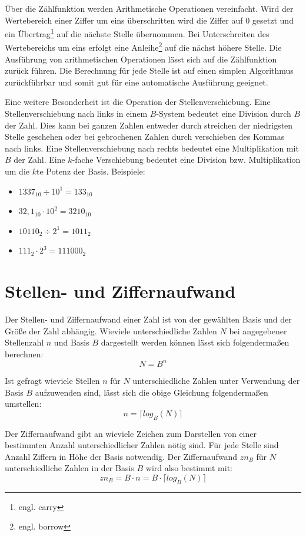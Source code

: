 \documentclass[11pt,a4paper]{scrreprt}
\begin{document}
Über die Zählfunktion  \label{Zählfunktion} werden Arithmetische Operationen vereinfacht. Wird der Wertebereich einer Ziffer um eins überschritten wird die Ziffer auf $0$ gesetzt und ein Übertrag\footnote{engl. carry} auf die nächste Stelle übernommen. Bei Unterschreiten des Wertebereichs um eins erfolgt eine Anleihe\footnote{engl. borrow} auf die nächst höhere Stelle. Die Ausführung von arithmetischen Operationen lässt sich auf die Zählfunktion zurück führen. Die Berechnung für jede Stelle ist auf einen simplen Algorithmus zurückführbar und somit gut für eine automatische Ausführung geeignet.

 Eine weitere Besonderheit ist die Operation der Stellenverschiebung.  Eine Stellenverschiebung nach links in einem $B$-System bedeutet eine Division durch $B$ der Zahl. Dies kann bei ganzen Zahlen entweder durch streichen der niedrigsten Stelle geschehen oder bei gebrochenen Zahlen durch verschieben des Kommas nach links. Eine Stellenverschiebung nach rechts bedeutet eine Multiplikation mit $B$ der Zahl. Eine $k$-fache Verschiebung bedeutet eine Division bzw. Multiplikation um die $k$te Potenz der Basis. Beispiele:
\begin{itemize}
	\item
	$1337_{10} \div 10^1 = 133_{10}$
	
	\item 
	$32,1_{10} \cdot 10^2 = 3210_{10}$
	
	\item
	$10110_2 \div 2^1 = 1011_2$
	
	\item
	$111_2 \cdot 2^3 = 111000_2$
\end{itemize}


\section{Stellen- und Ziffernaufwand}
Der Stellen- und Ziffernaufwand einer Zahl ist von der gewählten Basis und der Größe der Zahl abhängig. Wieviele unterschiedliche Zahlen $N$ bei angegebener Stellenzahl $n$ und Basis $B$ dargestellt werden können lässt sich folgendermaßen berechnen:
$$ 
	N = B^n 
$$

Ist gefragt wieviele Stellen $n$ für $N$ unterschiedliche Zahlen unter Verwendung der Basis $B$ aufzuwenden sind, lässt sich die obige Gleichung folgendermaßen umstellen:
$$
	n = \lceil log_B(N) \rceil
$$

Der Ziffernaufwand gibt an wieviele Zeichen zum Darstellen von einer bestimmten Anzahl unterschiedlicher Zahlen nötig sind. Für jede Stelle sind Anzahl Ziffern in Höhe der Basis notwendig. Der Ziffernaufwand $zn_B$ für $N$ unterschiedliche Zahlen in der Basis $B$ wird also bestimmt mit:
$$
	zn_B = B \cdot n = B \cdot \lceil log_B(N) \rceil
$$
\end{document}
